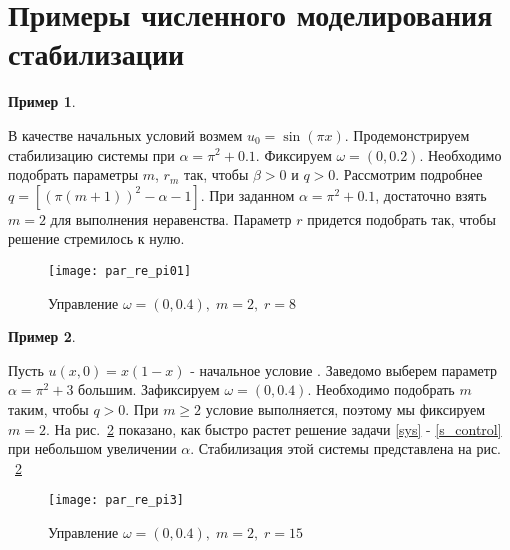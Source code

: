 \section{Примеры численного моделирования стабилизации}


\vspace{1em}

\newtheorem{exmp_st}{Пример}

\begin{exmp_st}
\end{exmp_st}

В качестве начальных условий возмем $u_0 = \sin(\pi x)$. Продемонстрируем 
стабилизацию системы при $\alpha = \pi^2 + 0.1$. Фиксируем $\omega = (0, 0.2)$. 
Необходимо подобрать параметры $m$, $r_m$ так, чтобы $\beta > 0$ и $q > 0$. 
Рассмотрим подробнее $q = [(\pi(m + 1))^2 - \alpha - 1]$. При заданном 
$\alpha = \pi^2 + 0.1$, достаточно взять $m = 2$ для выполнения неравенства. 
Параметр $r$ придется подобрать так, чтобы решение стремилось к нулю.


\begin{figure}[H]
    \centering
    \texttt{[image: par\_re\_pi01]}
    \caption{Управление $\omega = (0, 0.4),\; m = 2,\; r = 8$}
    \label{fig:fig03}
\end{figure}

\begin{exmp_st}
\end{exmp_st}

Пусть $u(x, 0) = x(1 - x)$ - начальное условие . Заведомо выберем параметр 
$\alpha = \pi^2 + 3$ большим. Зафиксируем $\omega = (0, 0.4)$. 
Необходимо подобрать $m$ таким, чтобы $q > 0$. При $m \ge 2$ условие выполняется, 
поэтому мы фиксируем $m = 2$. На рис.~\ref{fig:fig04} показано, как быстро растет решение 
задачи \eqref{sys} - \eqref{s_control} при небольшом увеличении $\alpha$. 
Стабилизация этой системы представлена на рис. ~\ref{fig:fig04}

\begin{figure}[H]
    \centering
    \texttt{[image: par\_re\_pi3]}
    \caption{Управление $\omega = (0, 0.4),\; m = 2,\; r = 15$}
    \label{fig:fig04}
\end{figure}

